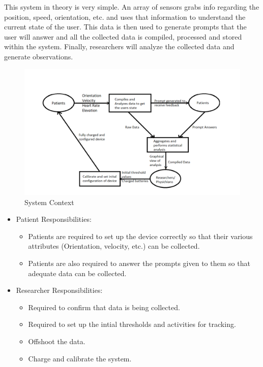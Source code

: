 \documentclass[12pt]{article}
\begin{document}
This system in theory is very simple. An array of sensors grabs info regarding the position, speed, orientation, etc. and uses that information to understand the current state of the user. This data is then used to generate prompts that the user will answer and all the collected data is compiled, processed and stored within the system. Finally, researchers will analyze the collected data and generate observations.
\begin{figure}[h!]
  \begin{center}
    \includegraphics[width=.95\textwidth]{System Context Diagram}
    \caption{System Context}
    \label{Fig_SystemContext}
  \end{center}
\end{figure}

\begin{itemize}
  \item Patient Responsibilities:
        \begin{itemize}
          \item Patients are required to set up the device correctly so that their various attributes (Orientation, velocity, etc.) can be collected.
          \item Patients are also required to answer the prompts given to them so that adequate data can be collected.
        \end{itemize}
  \item Researcher Responsibilities:
        \begin{itemize}
          \item Required to confirm that data is being collected.
          \item Required to set up the intial thresholds and activities for tracking.
          \item Offshoot the data.
          \item Charge and calibrate the system.
        \end{itemize}
\end{itemize}
\end{document}
